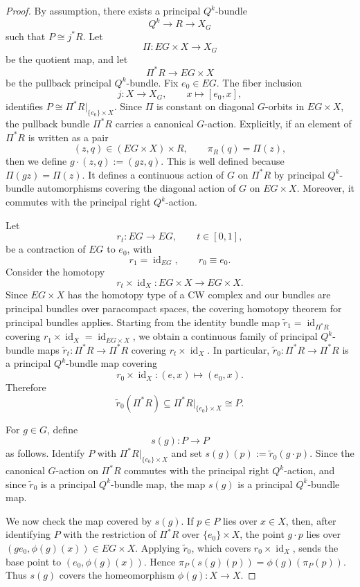 \documentclass[11pt,a4paper]{article}
\numberwithin{equation}{section}
\theoremstyle{named}
\begin{document}
\begin{proof}
By assumption, there exists a principal \(Q^k\)-bundle
\[
Q^k\longrightarrow R\longrightarrow X_G
\]
such that \(P\cong j^*R\). Let
\[
\Pi:EG\times X\longrightarrow X_G
\]
be the quotient map, and let
\[
\Pi^*R\longrightarrow EG\times X
\]
be the pullback principal \(Q^k\)-bundle. Fix \(e_0\in EG\). The fiber
inclusion
\[
j:X\longrightarrow X_G,\qquad x\longmapsto [e_0,x],
\]
identifies \(P\cong \Pi^*R\big|_{\{e_0\}\times X}\). Since \(\Pi\) is constant on diagonal \(G\)-orbits in \(EG\times X\), the pullback bundle \(\Pi^*R\) carries a canonical \(G\)-action. Explicitly, if an element of \(\Pi^*R\) is written as a pair
\[
(z,q)\in (EG\times X)\times R, \qquad \pi_R(q)=\Pi(z),
\]
then we define \(g\cdot(z,q):=(gz,q)\). This is well defined because \(\Pi(gz)=\Pi(z)\). It defines a continuous action of \(G\) on \(\Pi^*R\) by principal \(Q^k\)-bundle automorphisms covering the diagonal action of \(G\) on \(EG\times X\). Moreover, it commutes with the principal right \(Q^k\)-action.

Let
\[
r_t:EG\longrightarrow EG,\qquad t\in[0,1],
\]
be a contraction of \(EG\) to \(e_0\), with
\[
r_1=\operatorname{id}_{EG}, \qquad r_0\equiv e_0.
\]
Consider the homotopy
\[
r_t\times\operatorname{id}_X:EG\times X\longrightarrow EG\times X.
\]
Since \(EG\times X\) has the homotopy type of a CW complex and our bundles are principal bundles over paracompact spaces, the covering homotopy theorem for principal bundles applies. Starting from the identity bundle map \(\widetilde r_1=\operatorname{id}_{\Pi^*R}\) covering \(r_1\times\operatorname{id}_X=\operatorname{id}_{EG\times X}\), we obtain a continuous family of principal \(Q^k\)-bundle maps \(\widetilde r_t:\Pi^*R\longrightarrow \Pi^*R \) covering \(r_t\times\operatorname{id}_X.\) In particular,
\(\widetilde r_0:\Pi^*R\longrightarrow \Pi^*R\) is a principal \(Q^k\)-bundle map covering
\[
r_0\times\operatorname{id}_X:(e,x)\longmapsto(e_0,x).
\]
Therefore
\[
\widetilde r_0(\Pi^*R)\subseteq\Pi^*R\big|_{\{e_0\}\times X}\cong P.
\]

For \(g\in G\), define
\[
s(g):P\longrightarrow P
\]
as follows. Identify \(P\) with \(\Pi^*R\big|_{\{e_0\}\times X}\) and set \(s(g)(p):=\widetilde r_0(g\cdot p).\) Since the canonical \(G\)-action on \(\Pi^*R\) commutes with the principal right \(Q^k\)-action, and since \(\widetilde r_0\) is a principal \(Q^k\)-bundle map, the map \(s(g)\) is a principal \(Q^k\)-bundle map.

We now check the map covered by \(s(g)\). If \(p\in P\) lies over \(x\in X\), then, after identifying \(P\) with the restriction of \(\Pi^*R\) over \(\{e_0\}\times X\), the point \(g\cdot p\) lies over \((ge_0,\phi(g)(x))\in EG\times X.\) Applying \(\widetilde r_0\), which covers \(r_0\times\operatorname{id}_X\), sends the base point to \((e_0,\phi(g)(x)).\) Hence \(\pi_P(s(g)(p))=\phi(g)(\pi_P(p)).\) Thus \(s(g)\) covers the homeomorphism \(\phi(g):X\to X\).


\end{proof}
\end{document}
